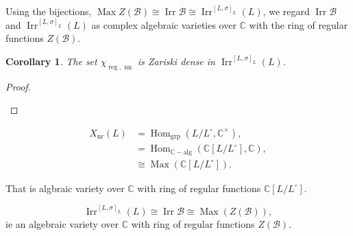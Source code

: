 \documentclass[8pt]{article}
\newtheorem{lemma}{Lemma}[section]
\newtheorem{corollary}{Corollary} [section]
\DeclareMathOperator{\Stab}{Stab}
\DeclareMathOperator{\unitary}{unitary}
\DeclareMathOperator{\Hom}{Hom}
\DeclareMathOperator{\Irr}{Irr}
\DeclareMathOperator{\nr}{nr}
\DeclareMathOperator{\nn}{nn}
\DeclareMathOperator{\reg}{reg}
\DeclareMathOperator{\Max}{Max}
\newcommand{\C}[0]{\mathbb{C}}
\newcommand{\sep}[0]{\:|\:}
\newcommand{\cB}{\mathcal{B}}
\begin{document}
Using the bijections, $\Max Z(\cB)\cong \Irr\cB\cong \Irr^{[L,\sigma]_L}(L)$, we regard $\Irr\cB$ and $\Irr^{[L,\sigma]_L}(L)$ as complex algebraic varieties over $\C$
with the ring of regular functions $Z(\cB)$.
\begin{corollary}
  \label{corollary_109}
  The set $\chi_{\reg,\nn}$ is Zariski dense in $\Irr^{[L,\sigma]_L}(L)$.
\end{corollary}
\begin{proof}$\:$
  \begin{center}
  \end{center}
\end{proof}

\begin{align*}
  X_{\nr}(L) & = \Hom_{\text{grp}}(L/L^\circ,\C^\times),\\
  & = \Hom_{\C-\text{alg}}(\C[L/L^\circ],\C),\\
  &\cong \Max(\C[L/L^\circ]).
\end{align*}

That is algbraic variety over $\C$ with ring of regular functions $\C[L/L^\circ]$. 

\begin{equation*}
  \Irr^{[L,\sigma]_L}(L)\cong \Irr\cB \cong \Max(Z(\cB)),
\end{equation*}
ie an algebraic variety over $\C$ with ring of regular functions $Z(\cB)$. 
\end{document}
